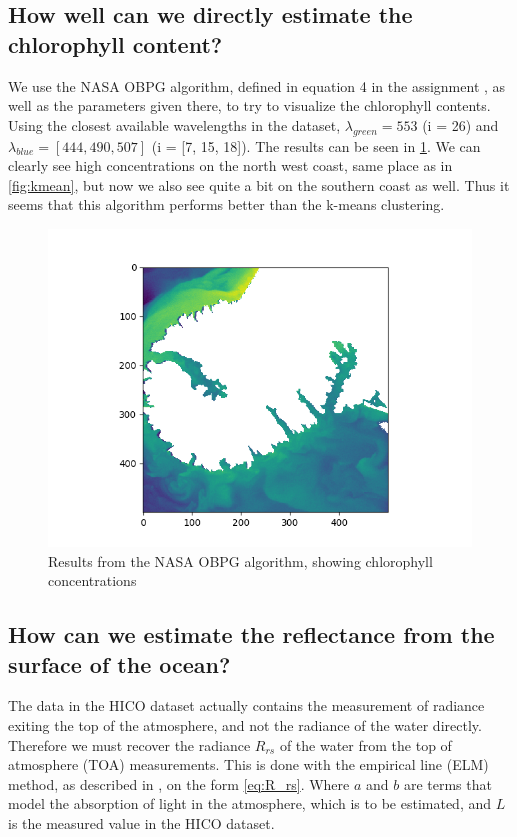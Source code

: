 \subsection{How well can we directly estimate the chlorophyll content?}

We use the NASA OBPG algorithm, defined in equation 4 in the assignment 
\cite{assignment}, as well as the parameters given there, to try to 
visualize the chlorophyll contents. Using the closest available wavelengths 
in the dataset, $\lambda_{green} = 553$ (i = 26) and $\lambda_{blue} = [444, 490, 507]$ 
(i = [7, 15, 18]). The results can be seen in \cref{fig:obpg}. We can clearly 
see high concentrations on the north west coast, same place as in \cref{fig:kmean}, 
but now we also see quite a bit on the southern coast as well. Thus it seems that this 
algorithm performs better than the k-means clustering. 

\begin{figure}
    \centering
    \includegraphics[width=\textwidth]{../fig/2b_nasa.png}
    \caption{Results from the NASA OBPG algorithm, showing chlorophyll concentrations}
    \label{fig:obpg}
\end{figure}

\subsection{How can we estimate the reflectance from the surface of the ocean?}

The data in the HICO dataset actually contains the measurement of radiance exiting the top 
of the atmosphere, and not the radiance of the water directly. Therefore we must recover the 
radiance $R_{rs}$ of the water from the top of atmosphere (TOA) measurements. This is done with 
the empirical line (ELM) method, as described in \cite{assignment}, on the form \cref{eq:R_rs}. 
Where $a$ and $b$ are terms that model the absorption of light in the atmosphere, which is to 
be estimated, and $L$ is the measured value in the HICO dataset. 

